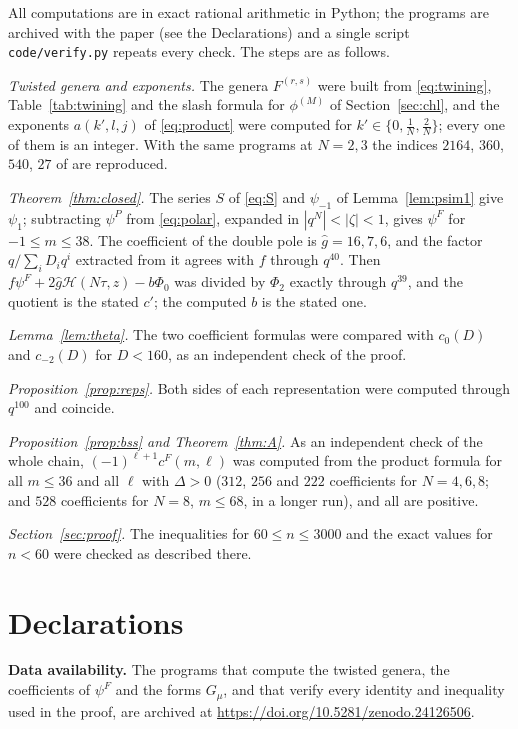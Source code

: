 \documentclass[11pt]{amsart}
\theoremstyle{definition}
\newcommand{\cF}{c^{F}}
\newcommand{\Hc}{\mathcal{H}}
\newcommand{\gh}{\hat g}
\newcommand{\zenodoCodeDOI}{10.5281/zenodo.24126506}
\begin{document}
All computations are in exact rational arithmetic in Python; the programs are archived with the paper (see the Declarations) and a single script \texttt{code/verify.py} repeats every check. The steps are as follows.

\emph{Twisted genera and exponents.} The genera $F^{(r,s)}$ were built from \eqref{eq:twining}, Table~\ref{tab:twining} and the slash formula for $\phi^{(M)}$ of Section~\ref{sec:chl}, and the exponents $a(k',l,j)$ of \eqref{eq:product} were computed for $k'\in\{0,\frac1N,\frac2N\}$; every one of them is an integer. With the same programs at $N=2,3$ the indices $2164$, $360$, $540$, $27$ of \cite[Tables~2--3]{Sen11} are reproduced.

\emph{Theorem~\ref{thm:closed}.} The series $S$ of \eqref{eq:S} and $\psi_{-1}$ of Lemma~\ref{lem:psim1} give $\psi_1$; subtracting $\psi^P$ from \eqref{eq:polar}, expanded in $|q^N|<|\zeta|<1$, gives $\psi^F$ for $-1\le m\le 38$. The coefficient of the double pole is $\gh=16,7,6$, and the factor $q/\sum_iD_iq^i$ extracted from it agrees with $f$ through $q^{40}$. Then $f\psi^F+2\gh\Hc(N\tau,z)-b\Phi_0$ was divided by $\Phi_2$ exactly through $q^{39}$, and the quotient is the stated $c'$; the computed $b$ is the stated one.

\emph{Lemma~\ref{lem:theta}.} The two coefficient formulas were compared with $c_0(D)$ and $c_{-2}(D)$ for $D<160$, as an independent check of the proof.

\emph{Proposition~\ref{prop:reps}.} Both sides of each representation were computed through $q^{100}$ and coincide.

\emph{Proposition~\ref{prop:bss} and Theorem~\ref{thm:A}.} As an independent check of the whole chain, $(-1)^{\ell+1}\cF(m,\ell)$ was computed from the product formula for all $m\le36$ and all $\ell$ with $\Delta>0$ ($312$, $256$ and $222$ coefficients for $N=4,6,8$; and $528$ coefficients for $N=8$, $m\le68$, in a longer run), and all are positive.

\emph{Section~\ref{sec:proof}.} The inequalities for $60\le n\le3000$ and the exact values for $n<60$ were checked as described there.

\section*{Declarations}

\noindent\textbf{Data availability.} The programs that compute the twisted genera, the coefficients of $\psi^F$ and the forms $G_\mu$, and that verify every identity and inequality used in the proof, are archived at \url{https://doi.org/\zenodoCodeDOI}.
\end{document}
